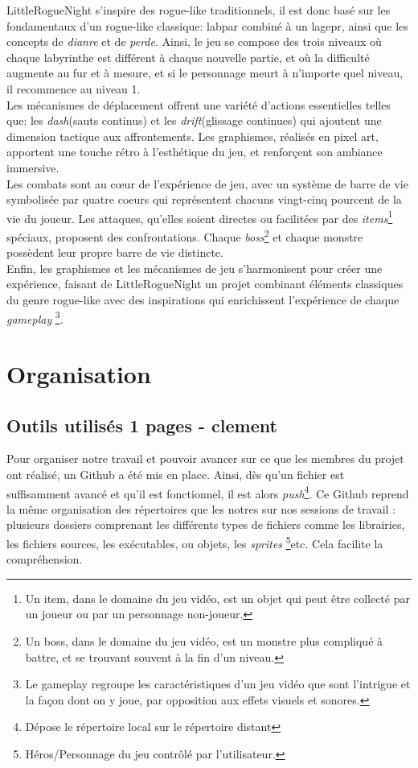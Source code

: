\documentclass[10pt]{article}
\begin{document}
LittleRogueNight s'inspire des rogue-like traditionnels, il est donc basé sur les fondamentaux d'un rogue-like classique: \gls{labpar} combiné à un
\gls{lagepr}, ainsi que les concepts de \textit{\gls{dianre}} et de \textit{\gls{perde}}. 
Ainsi, le jeu se compose des trois niveaux où chaque labyrinthe est différent à chaque nouvelle partie, 
et où la difficulté augmente au fur et à mesure, et si le personnage meurt à n'importe quel niveau, il recommence au niveau 1.\\

Les mécanismes de déplacement offrent une variété d'actions essentielles telles que: les \textit{\gls{dash}}(sauts continus) et 
les \textit{\gls{drift}}(glissage continues) qui ajoutent une dimension tactique aux affrontements. Les graphismes, réalisés en pixel art, apportent une touche rétro à 
l'esthétique du jeu, et renforçent son ambiance immersive.\\

Les combats sont au cœur de l'expérience de jeu, avec un système de barre de vie symbolisée par quatre coeurs qui représentent chacuns vingt-cinq pourcent 
de la vie du joueur. Les attaques, qu'elles soient directes ou facilitées par des \textit{\gls{items}}\footnote{Un item, dans le domaine du jeu vidéo, est un objet qui peut être 
collecté par un joueur ou par un personnage non-joueur.} 
spéciaux, proposent des confrontations. Chaque \textit{boss}\footnote{Un boss, dans le domaine du jeu vidéo, est un monstre plus compliqué à battre, 
et se trouvant souvent à la fin d'un niveau.} et chaque monstre 
possèdent leur propre barre de vie distincte.\\

Enfin, les graphismes et les mécanismes de jeu s'harmonisent pour créer une expérience, faisant de LittleRogueNight un projet 
combinant éléments classiques du genre rogue-like avec des inspirations qui enrichissent l'expérience de chaque \textit{gameplay}
\footnote{Le gameplay regroupe les caractéristiques d'un jeu vidéo que sont l'intrigue et la façon dont on y joue, par opposition aux effets visuels et sonores. }.\\

\section{Organisation}   
   \subsection{Outils utilisés 1 pages - clement}
   Pour organiser notre travail et pouvoir avancer sur ce que les membres du projet ont réalisé, un Github a été mis en place. Ainsi, dès qu'un fichier est
   suffisamment avancé et qu'il est fonctionnel, il est alors \textit{push}\footnote{Dépose le répertoire local sur le répertoire distant}.
   Ce Github reprend la même organisation des répertoires que les notres sur nos sessions de travail : plusieurs dossiers comprenant les différents types 
   de fichiers comme les librairies, les fichiers sources, les exécutables, ou objets, les \textit{sprites}
   \footnote{Héros/Personnage du jeu contrôlé par l'utilisateur.}etc. Cela facilite la compréhension.
\end{document}
